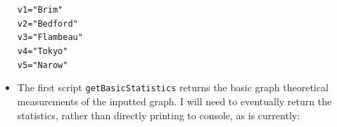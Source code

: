 \documentclass{article}\usepackage[]{graphicx}\usepackage[]{color}
\makeatletter
\newcommand{\hlstr}[1]{\textcolor[rgb]{0.192,0.494,0.8}{#1}}%
\newcommand{\hlstd}[1]{\textcolor[rgb]{0.345,0.345,0.345}{#1}}%
\newcommand{\hlkwb}[1]{\textcolor[rgb]{0.69,0.353,0.396}{#1}}%
\newenvironment{kframe}{%
 \def\at@end@of@kframe{}%
 \ifinner\ifhmode%
  \def\at@end@of@kframe{\end{minipage}}%
  \begin{minipage}{\columnwidth}%
 \fi\fi%
 \def\FrameCommand##1{\hskip\@totalleftmargin \hskip-\fboxsep
 \colorbox{shadecolor}{##1}\hskip-\fboxsep
     \hskip-\linewidth \hskip-\@totalleftmargin \hskip\columnwidth}%
 \MakeFramed {\advance\hsize-\width
   \@totalleftmargin\z@ \linewidth\hsize
   \@setminipage}}%
 {\par\unskip\endMakeFramed%
 \at@end@of@kframe}
\newenvironment{knitrout}{}{} %
\makeatother
\begin{document}
\begin{itemize}
\begin{knitrout}
\color{fgcolor}\begin{kframe}
\begin{alltt}
\hlstd{v1} \hlkwb{=} \hlstr{"Brim"}
\hlstd{v2} \hlkwb{=} \hlstr{"Bedford"}
\hlstd{v3} \hlkwb{=} \hlstr{"Flambeau"}
\hlstd{v4} \hlkwb{=} \hlstr{"Tokyo"}
\hlstd{v5} \hlkwb{=} \hlstr{"Narow"}
\end{alltt}
\end{kframe}
\end{knitrout}


\item The first script {\tt getBasicStatistics} returns the basic graph theoretical measurements of the inputted graph. I will need to eventually return the statistics, rather than directly printing to console, as is currently:


\end{itemize}
\end{document}
